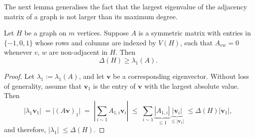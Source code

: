 The next lemma generalises the fact that the largest eigenvalue of the adjacency matrix of a graph is not larger than its maximum degree. 


\begin{lemma} \label{lem:maxdeg-sensitivity}
    Let $H$ be a graph on $m$ vertices.
    Suppose $A$ is a symmetric matrix with entries in $\{-1, 0, 1\}$ whose rows and columns are indexed by $V(H)$, such that $A_{vw} = 0$ whenever $v$, $w$ are non-adjacent in $H$.
    Then
    \begin{equation*}
        \Delta(H) \ge \lambda_1(A).
    \end{equation*}
\end{lemma}

\begin{proof}
    Let $\lambda_1 := \lambda_1(A)$, and let $\bm{v}$ be a corresponding eigenvector. 
    Without loss of generality, assume that $\bm{v}_1$ is the entry of $\bm{v}$ with the largest absolute value.
    Then 
    \begin{equation*}
        |\lambda_1 \bm{v}_1| \; = \big |(A \bm{v})_1 \big| \; = \;\left | \sum \limits_{i \sim 1}  A_{1, i} \bm{v}_i \right| \; 
            \le \;\sum \limits_{i \sim 1} \underbrace{|A_{1, i}|}_{\le 1} \underbrace{| \bm{v}_i |}_{\le |\bm{v}_1|} \;\le \Delta(H) |\bm{v}_1|,
    \end{equation*}
    and therefore, $|\lambda_1|\; \le \Delta(H)$.
\end{proof}

